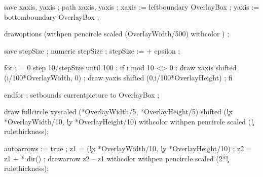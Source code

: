   save xaxis, yaxis ; path xaxis, yaxis ;
  xaxis := leftboundary OverlayBox ;
  yaxis := bottomboundary OverlayBox ;

  drawoptions (withpen pencircle scaled (OverlayWidth/500) 
               withcolor \MPcolor\simpleslidesGridColor) ;

  save stepSize ; numeric stepSize ;
  stepSize := \simpleslidesStepSize + epsilon ;

  for i = 0 step 10/stepSize until 100 :
    if i mod 10 <> 0 :
      draw xaxis shifted (i/100*OverlayWidth, 0) ;
      draw yaxis shifted (0,i/100*OverlayHeight) ;
    fi 

  endfor ;
  setbounds currentpicture to OverlayBox ;
\stopuseMPgraphic



  draw fullcircle xyscaled 
       (*OverlayWidth/5,
        *OverlayHeight/5) 
       shifted
       (\simpleslidesPictureParameter\c!x *OverlayWidth/10,
        \simpleslidesPictureParameter\c!y *OverlayHeight/10)  
       withcolor  
       withpen pencircle scaled (\simpleslidesPictureParameter\c!rulethickness);
\stopuseMPgraphic


  autoarrows := true ; %
  z1 = (\simpleslidesPictureParameter\c!x *OverlayWidth/10,
        \simpleslidesPictureParameter\c!y *OverlayHeight/10)   ;
  z2 = z1 +  *
            dir() ;
  drawarrow z2 -- z1   
       withcolor  
       withpen pencircle scaled (2*\simpleslidesPictureParameter\c!rulethickness);
\stopuseMPgraphic


